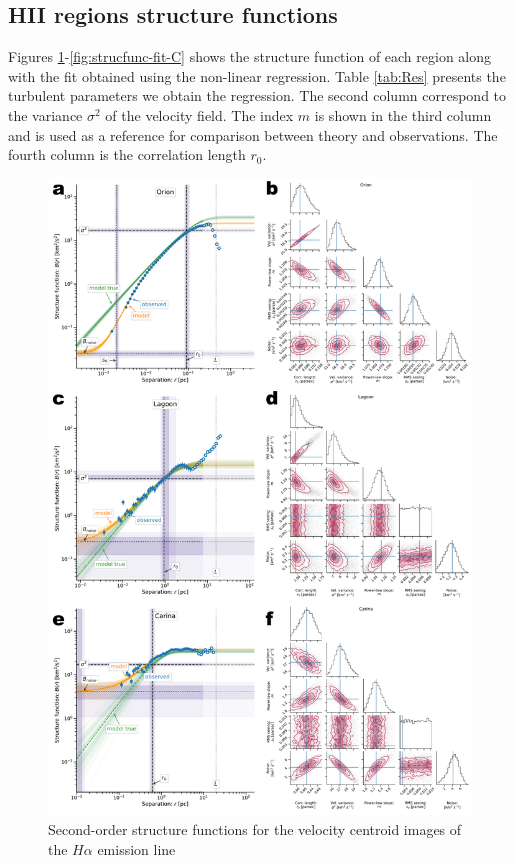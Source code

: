 \documentclass[fleqn,usenatbib, useAMS, a4paper]{mnras}
\begin{document}
\subsection{HII regions structure functions}

Figures \ref{fig:strucfunc-fit-A}-\ref{fig:strucfunc-fit-C} shows the structure function of each region along with the fit obtained using the non-linear regression.
Table \ref{tab:Res} presents the turbulent parameters we obtain the regression.
The second column correspond to the variance \(\sigma^2\) of the velocity field.
The index \(m\) is shown in the third column and is used as a reference for comparison between theory and observations.
The fourth column is the correlation length \(r_0\).

\begin{figure}
  \centering
  \includegraphics[width=0.8\linewidth]{Figures/strucfunc-fit-A}
  \caption{Second-order structure functions for the velocity centroid images of the \(H\alpha\) emission line}\label{fig:strucfunc-fit-A}
\end{figure}
\end{document}
